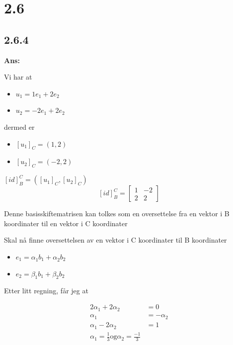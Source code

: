 \documentclass[11pt]{article}
\newenvironment{solbox}
  {\begin{mdframed}[linewidth=1pt,linecolor=black,roundcorner=5pt]
   \noindent\textbf{Ans: }\enspace}
  {\end{mdframed}}
\begin{document}
\section{2.6}

\subsection{2.6.4}

\begin{solbox}

  Vi har at 
  \begin{itemize}
    \item $ u_1 = 1e_1+2e_2 $ 
    \item $ u_2 = -2e_1 + 2e_2 $ 
  \end{itemize}

  dermed er 

  \begin{itemize}
    \item $ \left[ u_1 \right] _C = \left( 1, 2 \right)  $ 
    \item $ \left[ u_2 \right] _C = \left( -2, 2 \right)  $ 
  \end{itemize}

  $ \left[ id \right] _B^C = \left( \left[ u_1 \right] _C, \left[ u_2 \right] _C \right)  $ 
  \[
      \left[ id \right] _B^C = \begin{bmatrix}
        1&-2\\
        2&2
      \end{bmatrix}
  \]

  Denne basisskiftematrisen kan tolkes som en oversettelse fra en vektor i B koordinater til en vektor i C koordinater
  

  Skal nå finne oversettelsen av en vektor i C koordinater til B koordinater

  \begin{itemize}
    \item $e_1 = \alpha_{1}^{}  b_1 + \alpha_{2}^{}  b_2$
    \item $e_2 = \beta_1 b_1 + \beta_2 b_2$ 
  \end{itemize}

  Etter litt regning, får jeg at 

  \begin{align*}
    2 \alpha_{1}^{} + 2 \alpha_{2}^{} &= 0 \\
    \alpha_{1}^{} &= -\alpha_{2}^{} \\
    \alpha_{1}^{} -2 \alpha_{2}^{} &= 1  \\
    \alpha_{1}^{}  = \frac{1} {3} \text{og} \alpha_{2}^{} = \frac{-1} {3}  
  \end{align*}


\end{solbox}
\end{document}
